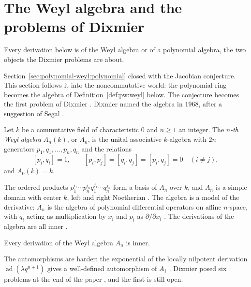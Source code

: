 \section{The Weyl algebra and the problems of Dixmier}\label{sec:polynomial-weyl:weyl}

Every derivation below is of the Weyl algebra or of a polynomial algebra, the two objects the Dixmier problems are about.

Section~\ref{sec:polynomial-weyl:polynomial} closed with the Jacobian
conjecture. This section follows it into the noncommutative world: the
polynomial ring becomes the algebra of Definition~\ref{def:pw:weyl} below. %
The conjecture becomes the first problem of Dixmier \cite[p.~241]{Dixmier1968}.
Dixmier named the algebra in 1968, after a suggestion of Segal
\cite[p.~209]{Dixmier1968}.

\begin{definition}\label{def:pw:weyl}
Let $k$ be a commutative field of characteristic $0$ and $n\geq1$ an
integer. The \emph{$n$-th Weyl algebra} $A_{n}(k)$, or $A_{n}$, is the
unital associative $k$-algebra with $2n$ generators
$p_{1},q_{1},\dots,p_{n},q_{n}$ and the relations
\[
[p_{i},q_{i}]=1,\qquad [p_{i},p_{j}]=[q_{i},q_{j}]=[p_{i},q_{j}]=0
\quad(i\neq j),
\]
and $A_{0}(k)=k$.
\end{definition}

The ordered products $p_{1}^{i_{1}}\cdots p_{n}^{i_{n}}q_{1}^{j_{1}}\cdots
q_{n}^{j_{n}}$ form a basis of $A_{n}$ over $k$, and $A_{n}$ is a simple
domain with center $k$, left and right Noetherian
\cite[p.~210]{Dixmier1968}. The algebra is a model of the derivative:
$A_{n}$ is the algebra of polynomial differential operators on affine
$n$-space, with $q_{i}$ acting as multiplication by $x_{i}$ and $p_{i}$ as
$\partial/\partial x_{i}$ \cite[p.~1]{BelovKanelKontsevich2007}. The
derivations of the algebra are all inner \cite[p.~210]{Dixmier1968}.

\begin{proposition}\label{prop:pw:weyl-inner}
Every derivation of the Weyl algebra $A_{n}$ is inner.
\end{proposition}

The automorphisms are harder: the exponential of the locally nilpotent
derivation $\operatorname{ad}(\lambda q^{n+1})$ gives a well-defined
automorphism of $A_{1}$ \cite[p.~210]{Dixmier1968}. Dixmier posed six
problems at the end of the paper \cite[p.~241]{Dixmier1968}, and the
first is still open.


